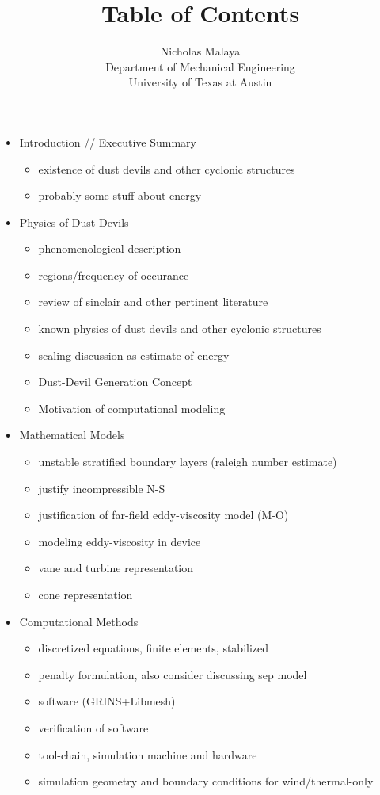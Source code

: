 \documentclass{article}
\title{\bf{Table of Contents}}
\author{Nicholas Malaya \\ Department of Mechanical Engineering \\ University of Texas at Austin} \date{}
\begin{document}
\maketitle

\begin{itemize}
 \item Introduction // Executive Summary
       \begin{itemize}
	\item existence of dust devils and other cyclonic structures
	\item probably some stuff about energy
       \end{itemize}

 \item Physics of Dust-Devils
       \begin{itemize} 
	\item phenomenological description
	\item regions/frequency of occurance
	\item review of sinclair and other pertinent literature
        \item known physics of dust devils and other cyclonic structures
	\item scaling discussion as estimate of energy
	\item Dust-Devil Generation Concept
	\item Motivation of computational modeling
       \end{itemize}

 \item Mathematical Models
       \begin{itemize}
	\item unstable stratified boundary layers (raleigh number estimate)
	\item justify incompressible N-S
	\item justification of far-field eddy-viscosity model (M-O)
	\item modeling eddy-viscosity in device 
	\item vane and turbine representation
	\item cone representation
       \end{itemize}

 \item Computational Methods
       \begin{itemize}
	\item discretized equations, finite elements, stabilized
	\item penalty formulation, also consider discussing sep model
	\item software (GRINS+Libmesh)
	\item verification of software
	\item tool-chain, simulation machine and hardware
	\item simulation geometry and boundary conditions for wind/thermal-only
       \end{itemize}


\end{itemize}
\end{document}

